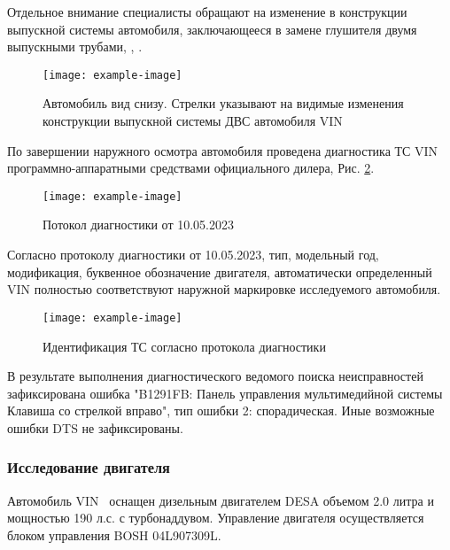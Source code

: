 Отдельное внимание специалисты обращают на изменение в конструкции выпускной системы автомобиля, заключающееся в замене  глушителя двумя выпускными трубами, , .\\


   \begin{figure}[H]
   	\centering
   	\texttt{[image: example-image]}
    \label{constr}
   	\caption{Автомобиль вид снизу. Стрелки указывают на видимые изменения конструкции выпускной системы ДВС автомобиля  VIN \vin}
     \end{figure}
   
    По завершении наружного осмотра автомобиля проведена диагностика ТС VIN \vin\, программно-аппаратными средствами   официального дилера, Рис. \ref{пд}.
       \begin{figure}[H]
    	\centering
    	\texttt{[image: example-image]}
    	\caption{Потокол диагностики от 10.05.2023}
    	\label{пд}
    \end{figure}
    
      Согласно протоколу диагностики от 10.05.2023, тип, модельный год, модификация, буквенное обозначение двигателя, автоматически определенный VIN полностью соответствуют наружной маркировке исследуемого автомобиля.
   
   \begin{figure}[H]
   	\centering
   	\texttt{[image: example-image]}
   	\caption{Идентификация ТС согласно протокола диагностики}
   	\label{модельсканер}
   \end{figure}
   
   В результате выполнения диагностического ведомого поиска неисправностей  зафиксирована ошибка "B1291FB:  Панель управления мультимедийной системы Клавиша со стрелкой вправо", тип ошибки 2: спорадическая. Иные  возможные  ошибки DTS не зафиксированы. \\
   
\subsubsection{Исследование двигателя}
     
 Автомобиль  VIN \vin \, оснащен  дизельным двигателем DESA объемом 2.0 литра и мощностью 190 л.с. с турбонаддувом. Управление двигателя осуществляется блоком управления BOSH 04L907309L. 
  

